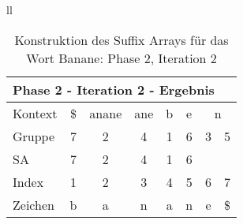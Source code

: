 \begin{table}[H]
\begin{adjustbox}{max width=\textwidth}
\begin{tabular}{ll}
\begin{tabular}{lccccccc}
\multicolumn{8}{l}{Phase 2 - Iteration 2 - Ergebnis}                                                                                                                                                             \\ \hline
\multicolumn{1}{l|}{Kontext} & \multicolumn{1}{c|}{\$} & \multicolumn{1}{c|}{anane} & \multicolumn{1}{c|}{ane} & \multicolumn{1}{c|}{b}                         & \multicolumn{1}{c|}{e} & \multicolumn{2}{c}{n} \\
\multicolumn{1}{l|}{Gruppe}  & \multicolumn{1}{c|}{7}  & \multicolumn{1}{c|}{2}     & \multicolumn{1}{c|}{4}   & \multicolumn{1}{c|}{1}                         & \multicolumn{1}{c|}{6} & 3         & 5          \\ 
\multicolumn{1}{l|}{SA}      & \multicolumn{1}{c|}{7}    & \multicolumn{1}{c|}{2}     & \multicolumn{1}{c|}{4}   &  \multicolumn{1}{c|}{\cellcolor[HTML]{\yellow}1}   & \multicolumn{1}{c|}{6} &           &            \\ \hline
\multicolumn{1}{l|}{Index}   & 1                       & 2                          & 3                        & 4                                              & 5                      & 6         & 7          \\
\multicolumn{1}{l|}{Zeichen} & b                       & a                          & n                        & a                                              & n                      & e         & \$        
\end{tabular}

\end{tabular}
\end{adjustbox}

\caption[Konstruktion des Suffix Arrays f{\"u}r das Wort Banane: Phase 2, Iteration 2]{Konstruktion des Suffix Arrays f{\"u}r das Wort Banane: Phase 2, Iteration 2}
\label{fig_banane_2_2} 
\end{table}

